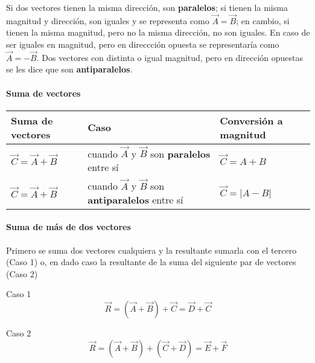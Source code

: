 \documentclass[
]{article}
\begin{document}
Si dos vectores tienen la misma dirección, son \textbf{paralelos}; si
tienen la misma magnitud y dirección, son iguales y se representa como
{\(\overset{\rightarrow}{A} = \overset{\rightarrow}{B}\)}; en cambio, si
tienen la misma magnitud, pero no la misma dirección, no son iguales. En
caso de ser iguales en magnitud, pero en direccción opuesta se
representaría como
{\(\overset{\rightarrow}{A} = - \overset{\rightarrow}{B}\)}. Dos
vectores con distinta o igual magnitud, pero en dirección opuestas se
les dice que son \textbf{antiparalelos}.

\hypertarget{suma-de-vectores}{%
\paragraph{Suma de vectores}\label{suma-de-vectores}}

\begin{longtable}[]{@{}lll@{}}
\toprule()
Suma de vectores & Caso & Conversión a magnitud \\
\midrule()
\endhead
{\(\overset{\rightarrow}{C} = \overset{\rightarrow}{A} + \overset{\rightarrow}{B}\)}
& cuando {\(\overset{\rightarrow}{A}\)} y {\(\overset{\rightarrow}{B}\)}
son \textbf{paralelos} entre sí &
{\(\overset{\rightarrow}{C} = A + B\)} \\
{\(\overset{\rightarrow}{C} = \overset{\rightarrow}{A} + \overset{\rightarrow}{B}\)}
& cuando {\(\overset{\rightarrow}{A}\)} y {\(\overset{\rightarrow}{B}\)}
son \textbf{antiparalelos} entre sí &
{\(\overset{\rightarrow}{C} = \text{|}A - B\text{|}\)} \\
\bottomrule()
\end{longtable}

\hypertarget{suma-de-muxe1s-de-dos-vectores}{%
\paragraph{Suma de más de dos
vectores}\label{suma-de-muxe1s-de-dos-vectores}}

Primero se suma dos vectores cualquiera y la resultante sumarla con el
tercero (Caso 1) o, en dado caso la resultante de la suma del siguiente
par de vectores (Caso 2)

Caso
1{\[\overset{\rightarrow}{R} = (\overset{\rightarrow}{A} + \overset{\rightarrow}{B}) + \overset{\rightarrow}{C} = \overset{\rightarrow}{D} + \overset{\rightarrow}{C}\]}

Caso
2{\[\overset{\rightarrow}{R} = (\overset{\rightarrow}{A} + \overset{\rightarrow}{B}) + (\overset{\rightarrow}{C} + \overset{\rightarrow}{D}) = \overset{\rightarrow}{E} + \overset{\rightarrow}{F}\]}
\end{document}
